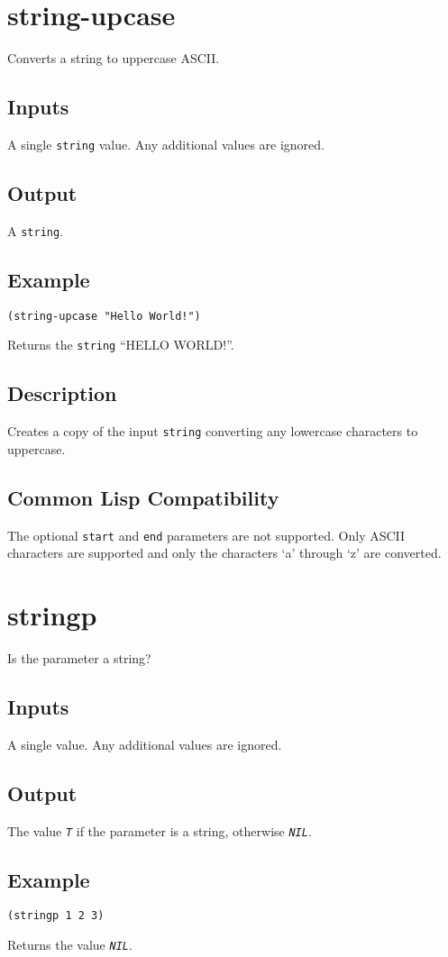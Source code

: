 \documentclass[10pt, openany]{book}
\newcommand{\constant}[1]{\emph{\texttt{#1}}}
\newcommand{\keyword}[1]{\texttt{#1}}
\newcommand{\datatype}[1]{\texttt{#1}}
\begin{document}
\section{string-upcase}
Converts a string to uppercase ASCII.
\subsection{Inputs}
A single \datatype{string} value.  Any additional values are ignored.
\subsection{Output}
A \datatype{string}.
\subsection{Example}
\begin{lstlisting}
(string-upcase "Hello World!")
\end{lstlisting}
Returns the \datatype{string} ``HELLO WORLD!''.
\subsection{Description}
Creates a copy of the input \datatype{string} converting any lowercase characters to uppercase.
\subsection{Common Lisp Compatibility}
The optional \keyword{start} and \keyword{end} parameters are not supported.  Only ASCII characters are supported and only the characters `a' through `z' are converted.

\section{stringp}
Is the parameter a string?
\subsection{Inputs}
A single value.  Any additional values are ignored.
\subsection{Output}
The value \constant{T} if the parameter is a string, otherwise \constant{NIL}.
\subsection{Example}
\begin{lstlisting}
(stringp 1 2 3)
\end{lstlisting}
Returns the value \constant{NIL}.
\end{document}
